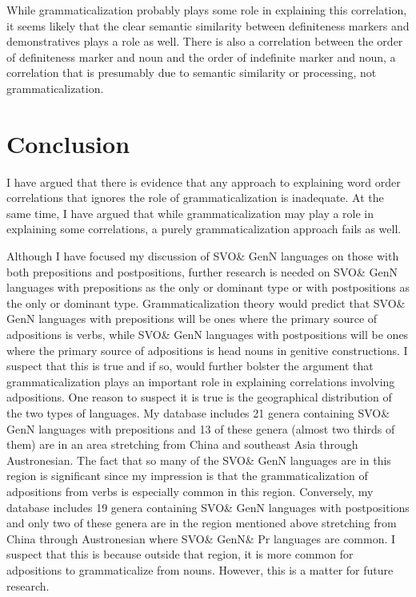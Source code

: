 \documentclass[output=paper]{langsci/langscibook}
\begin{document}
While grammaticalization probably plays some role in explaining this correlation, it seems likely that the clear semantic similarity between definiteness markers and demonstratives plays a role as well. There is also a correlation between the order of definiteness marker and noun and the order of indefinite marker and noun, a correlation that is presumably due to semantic similarity or processing, not grammaticalization.

\section{Conclusion}\label{sec:dryer:5}

I have argued that there is evidence that any approach to explaining word order correlations that ignores the role of grammaticalization is inadequate. At the same time, I have argued that while grammaticalization may play a role in explaining some correlations, a purely grammaticalization approach fails as well.

Although I have focused my discussion of SVO\& GenN languages on those with both prepositions and postpositions, further research is needed on SVO\& GenN languages with prepositions as the only or dominant type or with postpositions as the only or dominant type. Grammaticalization theory would predict that SVO\& GenN languages with prepositions will be ones where the primary source of adpositions is verbs, while SVO\& GenN languages with postpositions will be ones where the primary source of adpositions is head nouns in genitive constructions. I suspect that this is true and if so, would further bolster the argument that grammaticalization plays an important role in explaining correlations involving adpositions. One reason to suspect it is true is the geographical distribution of the two types of languages. My database includes 21 genera containing SVO\& GenN languages with prepositions and 13 of these genera (almost two thirds of them) are in an area stretching from China and southeast Asia through Austronesian. The fact that so many of the SVO\& GenN languages are in this region is significant since my impression is that the grammaticalization of adpositions from verbs is especially common in this region. Conversely, my database includes 19 genera containing SVO\& GenN languages with postpositions and only two of these genera are in the region mentioned above stretching from China through Austronesian where SVO\& GenN\& Pr languages are common. I suspect that this is because outside that region, it is more common for adpositions to grammaticalize from nouns. However, this is a matter for future research.
\end{document}
